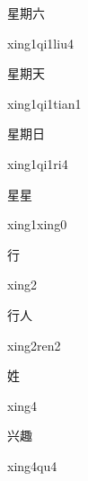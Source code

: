 \begin{multicols*}{2}
\begin{verbete}{星期六}
\begin{pronuncia}{xing1qi1liu4}
\end{pronuncia}
\end{verbete}

\begin{verbete}{星期天}
\begin{pronuncia}{xing1qi1tian1}
\end{pronuncia}
\end{verbete}

\begin{verbete}[xing1qi1ri4]{星期日}
\begin{pronuncia}{xing1qi1ri4}
\end{pronuncia}
\end{verbete}

\begin{verbete}{星星}
\begin{pronuncia}{xing1xing0}
\end{pronuncia}
\end{verbete}

\begin{verbete}[xing2]{行}
\begin{pronuncia}{xing2}
\end{pronuncia}
\end{verbete}

\begin{verbete}{行人}
\begin{pronuncia}{xing2ren2}
\end{pronuncia}
\end{verbete}

\begin{verbete}[xing4]{姓}
\begin{pronuncia}{xing4}
\end{pronuncia}
\end{verbete}

\begin{verbete}[xing4qu4]{兴趣}
\begin{pronuncia}{xing4qu4}
\end{pronuncia}
\end{verbete}


\end{multicols*}
